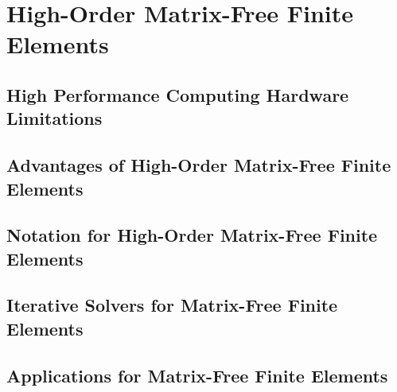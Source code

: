 \chapter{High-Order Matrix-Free Finite Elements}\label{ch:HighOrderFEM}


\section{High Performance Computing Hardware Limitations}\label{sec:highorderwhy}


\section{Advantages of High-Order Matrix-Free Finite Elements}\label{sec:highorderbenefits}


\section{Notation for High-Order Matrix-Free Finite Elements}\label{sec:highordernotation}


\section{Iterative Solvers for Matrix-Free Finite Elements}\label{sec:highordersolvers}


\section{Applications for Matrix-Free Finite Elements}\label{sec:libceedapplications}
